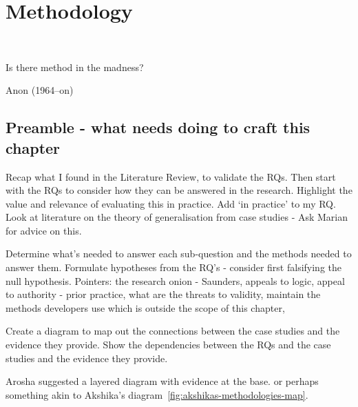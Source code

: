\chapter{Methodology}~\label{chapter-methodology}
\epigraph{Is there method in the madness?}{Anon (1964--on)}

\section*{Preamble - what needs doing to craft this chapter}
{\small
Recap what I found in the Literature Review, to validate the RQs. Then start with the RQs to consider how they can be answered in the research. Highlight the value and relevance of evaluating this in practice. Add `in practice' to my RQ. Look at literature on the theory of generalisation from case studies - Ask Marian for advice on this.

Determine what's needed to answer each sub-question and the methods needed to answer them. Formulate hypotheses from the RQ's - consider first falsifying the null hypothesis. Pointers: the research onion - Saunders, appeals to logic, appeal to authority - prior practice, what are the threats to validity, maintain the methods developers use which is outside the scope of this chapter,

Create a diagram to map out the connections between the case studies and the evidence they provide. Show the dependencies between the RQs and the case studies and the evidence they provide.

Arosha suggested a layered diagram with evidence at the base. or perhaps something akin to Akshika's diagram~\ref{fig:akshikas-methodologies-map}.
}

